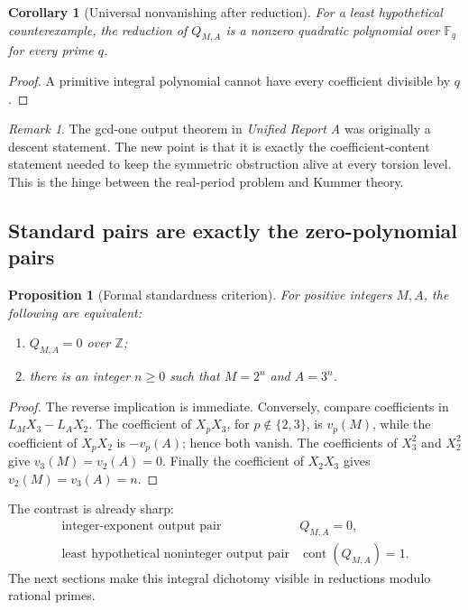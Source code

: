 \documentclass[11pt]{article}
\numberwithin{equation}{section}
\newtheorem{proposition}[theorem]{Proposition}
\newtheorem{corollary}[theorem]{Corollary}
\theoremstyle{definition}
\theoremstyle{remark}
\newtheorem{remark}[theorem]{Remark}
\newcommand{\Z}{\mathbb Z}
\newcommand{\F}{\mathbb F}
\newcommand{\cont}{\operatorname{cont}}
\newcommand{\ReportA}{\textit{Unified Report A}}
\begin{document}
\begin{corollary}[Universal nonvanishing after reduction]
\label{cor:modqnonzero}
For a least hypothetical counterexample, the reduction of \(Q_{M,A}\) is a nonzero quadratic
polynomial over \(\F_q\) for every prime \(q\).
\end{corollary}

\begin{proof}
A primitive integral polynomial cannot have every coefficient divisible by \(q\).
\end{proof}

\begin{remark}
The gcd-one output theorem in \ReportA{} was originally a descent statement.  The new point
is that it is exactly the coefficient-content statement needed to keep the symmetric
obstruction alive at every torsion level.  This is the hinge between the real-period problem
and Kummer theory.
\end{remark}

\subsection{Standard pairs are exactly the zero-polynomial pairs}

\begin{proposition}[Formal standardness criterion]
\label{prop:Qzero}
For positive integers \(M,A\), the following are equivalent:
\begin{enumerate}
\item \(Q_{M,A}=0\) over \(\Z\);
\item there is an integer \(n\ge0\) such that \(M=2^n\) and \(A=3^n\).
\end{enumerate}
\end{proposition}

\begin{proof}
The reverse implication is immediate.  Conversely, compare coefficients in
\(L_MX_3-L_AX_2\).  The coefficient of \(X_pX_3\), for \(p\notin\{2,3\}\), is
\(v_p(M)\), while the coefficient of \(X_pX_2\) is \(-v_p(A)\); hence both vanish.  The
coefficients of \(X_3^2\) and \(X_2^2\) give \(v_3(M)=v_2(A)=0\).  Finally the coefficient
of \(X_2X_3\) gives \(v_2(M)=v_3(A)=n\).
\end{proof}

The contrast is already sharp:
\[
 \begin{array}{c|c}
 \text{integer-exponent output pair} & Q_{M,A}=0,\\
 \text{least hypothetical noninteger output pair} & \cont(Q_{M,A})=1.
 \end{array}
\]
The next sections make this integral dichotomy visible in reductions modulo rational primes.
\end{document}
